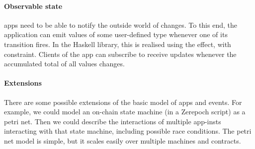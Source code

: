\paragraph{Observable state}

\glspl{app} need to be able to notify the outside world of changes.
To this end, the application can emit values of some user-defined type  whenever one of its transition fires.
In the Haskell library, this is realised using the  effect, with  constraint.
Clients of the \gls{app} can subscribe to receive updates whenever the accumulated total of all values changes.

\paragraph{Extensions}

There are some possible extensions of the basic model of apps and events.
For example, we could model an on-chain state machine (in a Zerepoch script) as a petri net.
Then we could describe the interactions of multiple \glspl{app-inst} interacting with that state machine, including possible race conditions.
The petri net model is simple, but it scales easily over multiple machines and contracts.
